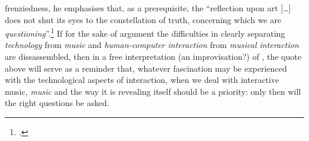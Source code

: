 frenziedness, he emphasises that, as a prerequisite, the ``reflection upon art [\ldots] does not shut its eyes to the constellation of truth, concerning which we are \emph{questioning}''.\footcite[340]{heidegger93} If for the sake of argument the difficulties in clearly separating \emph{technology} from \emph{music} and \emph{human-computer interaction} from \emph{musical interaction} are dissassembled, then in a free interpretation (an improvisation?) of \citeauthor{heidegger93}, the quote above will serve as a reminder that, whatever fascination may be experienced with the technological aspects of interaction, when we deal with interactive music, \emph{music} and the way it is revealing itself should be a priority: only then will the right questions be asked.



